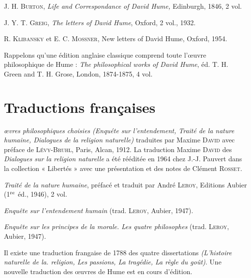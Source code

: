 J. H. \textsc{Burton}, {\it Life and Correspondance of David Hume,}
Edinburgh, 1846, 2 vol.

J. Y. T. \textsc{Greig}, {\it The letters of David Hume}, Oxford, 2 vol.,
1932.

R. \textsc{Klibansky} et E. C. \textsc{Mossner}, {\it }New letters of David
Hume, Oxford, 1954.

Rappelons qu’une édition anglaise classique comprend
toute l’{\oe}uvre philosophique de Hume : {\it The philosophical
works of David Hume}, éd. T. H. Green and T. H. Grose,
London, 1874-1875, 4 vol.

\section{Traductions françaises}

{\it {\oe}vres philosophiques choisies (Enquéte sur l'entendement,
Traité de la nature humaine, Dialogues de la religion
naturelle)}  traduites par Maxime \textsc{David} avec préface
de \textsc{Lévy-Bruhl}, Paris, Alcan, 1912. La traduction
Maxime \textsc{David} des {\it Dialogues sur la religion naturelle}
a été rééditée en 1964 chez J.-J. Pauvert dans la collection 
« Libertés » avec une présentation et des notes
de Clément \textsc{Rosset}.

{\it Traité de la nature humaine}, préfacé et traduit par André
\textsc{Leroy}, Editions Aubier (1$^{\text re}$ éd., 1946), 2 vol.

{\it Enquête sur l'entendement humain} (trad. \textsc{Leroy}, Aubier,
1947).

{\it Enquête sur les principes de la morale. Les quatre philosophes} 
(trad. \textsc{Leroy}, Aubier, 1947).

Il existe une traduction frangaise de 1788 des quatre
dissertations {\it (L’histoire naturelle de la. religion, Les passions, 
La tragédie, La règle du goût)}. Une nouvelle traduction 
des {\oe}uvres de Hume est en cours d’édition.

 

 
